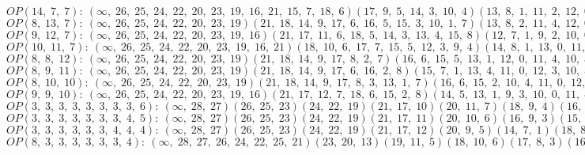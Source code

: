$OP(14, \;7, \;7): \:(\infty, \;26, \;25, \;24, \;22, \;20, \;23, \;19, \;16, \;21, \;15, \;7, \;18, \;6)(17, \;9, \;5, \;14, \;3, \;10, \;4)(13, \;8, \;1, \;11, \;2, \;12, \;0)$\\
$OP(8, \;13, \;7): \:(\infty, \;26, \;25, \;24, \;22, \;20, \;23, \;19)(21, \;18, \;14, \;9, \;17, \;6, \;16, \;5, \;15, \;3, \;10, \;1, \;7)(13, \;8, \;2, \;11, \;4, \;12, \;0)$\\
$OP(9, \;12, \;7): \:(\infty, \;26, \;25, \;24, \;22, \;20, \;23, \;19, \;16)(21, \;17, \;11, \;6, \;18, \;5, \;14, \;3, \;13, \;4, \;15, \;8)(12, \;7, \;1, \;9, \;2, \;10, \;0)$\\
$OP(10, \;11, \;7): \:(\infty, \;26, \;25, \;24, \;22, \;20, \;23, \;19, \;16, \;21)(18, \;10, \;6, \;17, \;7, \;15, \;5, \;12, \;3, \;9, \;4)(14, \;8, \;1, \;13, \;0, \;11, \;2)$\\
$OP(8, \;8, \;12): \:(\infty, \;26, \;25, \;24, \;22, \;20, \;23, \;19)(21, \;18, \;14, \;9, \;17, \;8, \;2, \;7)(16, \;6, \;15, \;5, \;13, \;1, \;12, \;0, \;11, \;4, \;10, \;3)$\\
$OP(8, \;9, \;11): \:(\infty, \;26, \;25, \;24, \;22, \;20, \;23, \;19)(21, \;18, \;14, \;9, \;17, \;6, \;16, \;2, \;8)(15, \;7, \;1, \;13, \;4, \;11, \;0, \;12, \;3, \;10, \;5)$\\
$OP(8, \;10, \;10): \:(\infty, \;26, \;25, \;24, \;22, \;20, \;23, \;19)(21, \;18, \;14, \;9, \;17, \;8, \;3, \;13, \;1, \;7)(16, \;6, \;15, \;2, \;10, \;4, \;11, \;0, \;12, \;5)$\\
$OP(9, \;9, \;10): \:(\infty, \;26, \;25, \;24, \;22, \;20, \;23, \;19, \;16)(21, \;17, \;12, \;7, \;18, \;6, \;15, \;2, \;8)(14, \;5, \;13, \;1, \;9, \;3, \;10, \;0, \;11, \;4)$\\

$OP(3, \;3, \;3, \;3, \;3, \;3, \;3, \;3, \;6): \:(\infty, \;28, \;27)(26, \;25, \;23)(24, \;22, \;19)(21, \;17, \;10)(20, \;11, \;7)(18, \;9, \;4)(16, \;8, \;1)(12, \;6, \;0)(15, \;5, \;13, \;3, \;14, \;2)$\\
$OP(3, \;3, \;3, \;3, \;3, \;3, \;3, \;4, \;5): \:(\infty, \;28, \;27)(26, \;25, \;23)(24, \;22, \;19)(21, \;17, \;11)(20, \;10, \;6)(16, \;9, \;3)(15, \;8, \;0)(13, \;4, \;12, \;1)(18, \;7, \;2, \;14, \;5)$\\
$OP(3, \;3, \;3, \;3, \;3, \;3, \;4, \;4, \;4): \:(\infty, \;28, \;27)(26, \;25, \;23)(24, \;22, \;19)(21, \;17, \;12)(20, \;9, \;5)(14, \;7, \;1)(18, \;8, \;15, \;6)(16, \;4, \;10, \;2)(13, \;3, \;11, \;0)$\\
$OP(8, \;3, \;3, \;3, \;3, \;3, \;3, \;4): \:(\infty, \;28, \;27, \;26, \;24, \;22, \;25, \;21)(23, \;20, \;13)(19, \;11, \;5)(18, \;10, \;6)(17, \;8, \;3)(16, \;9, \;0)(12, \;7, \;1)(15, \;4, \;14, \;2)$\\
